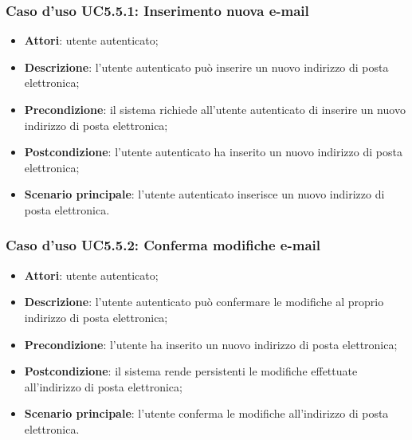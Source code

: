 \subsubsection{Caso d'uso UC5.5.1: Inserimento nuova e-mail}

\begin{itemize}
	\item \textbf{Attori}: utente autenticato;
	\item \textbf{Descrizione}: l'utente autenticato può inserire un nuovo indirizzo di posta elettronica;
	\item \textbf{Precondizione}: il sistema richiede all'utente autenticato di inserire un nuovo indirizzo di posta elettronica;
	\item \textbf{Postcondizione}: l'utente autenticato ha inserito un nuovo indirizzo di posta elettronica;
	\item \textbf{Scenario principale}: l'utente autenticato inserisce un nuovo indirizzo di posta elettronica.
\end{itemize}

\subsubsection{Caso d'uso UC5.5.2: Conferma modifiche e-mail}

\begin{itemize}
	\item \textbf{Attori}: utente autenticato;
	\item \textbf{Descrizione}: l'utente autenticato può confermare le modifiche al proprio indirizzo di posta elettronica;
	\item \textbf{Precondizione}: l'utente ha inserito un nuovo indirizzo di posta elettronica;
	\item \textbf{Postcondizione}: il sistema rende persistenti le modifiche effettuate all'indirizzo di posta elettronica;
	\item \textbf{Scenario principale}: l'utente conferma le modifiche all'indirizzo di posta elettronica.
\end{itemize}

